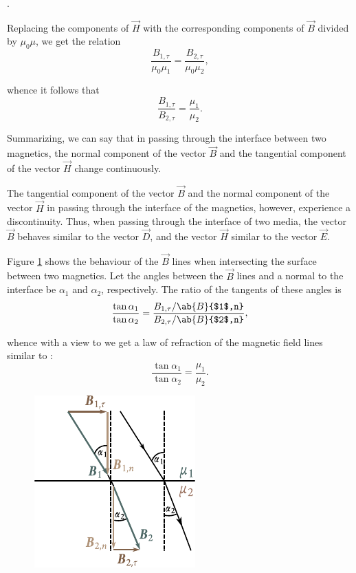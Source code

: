 .

Replacing the components of $\vec{H}$ with the corresponding components of $\vec{B}$ divided by $\mu_0\mu$, we get the relation
\begin{equation*}
    \frac{B_{1,\tau}}{\mu_0\mu_1} = \frac{B_{2,\tau}}{\mu_0\mu_2},
\end{equation*}

\noindent
whence it follows that
\begin{equation}\label{eq:7_36}
    \frac{B_{1,\tau}}{B_{2,\tau}} = \frac{\mu_1}{\mu_2}.
\end{equation}

Summarizing, we can say that in passing through the interface between two magnetics, the normal component of the vector $\vec{B}$ and the tangential component of the vector $\vec{H}$ change continuously.

The tangential component of the vector $\vec{B}$ and the normal component of the vector $\vec{H}$ in passing through the interface of the magnetics, however, experience a discontinuity.
Thus, when passing through the interface of two media, the vector $\vec{B}$ behaves similar to the vector $\vec{D}$, and the vector $\vec{H}$ similar to the vector $\vec{E}$.

Figure \ref{fig:7_7} shows the behaviour of the $\vec{B}$ lines when intersecting the surface between two magnetics.
Let the angles between the $\vec{B}$ lines and a normal to the interface be $\alpha_1$ and $\alpha_2$, respectively.
The ratio of the tangents of these angles is
\begin{equation*}
    \frac{\tan{\alpha_1}}{\tan{\alpha_2}} = \frac{B_{1,\tau}/\ab{B}{$1$,n}}{B_{2,\tau}/\ab{B}{$2$,n}},
\end{equation*}

\noindent
whence with a view to  we get a law of refraction of the magnetic field lines similar to :
\begin{equation}\label{eq:7_37}
    \frac{\tan{\alpha_1}}{\tan{\alpha_2}} = \frac{\mu_1}{\mu_2}.
\end{equation}

\begin{figure}[!htb]
	\begin{center}
		\includegraphics[scale=1.1]{figures/ch_07/fig_7_7.pdf}
		\caption[]{}
		\label{fig:7_7}
	\end{center}
	\vspace{-0.8cm}
\end{figure}

